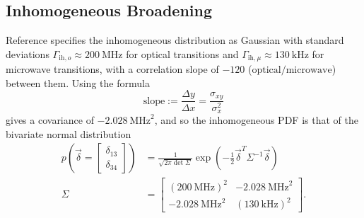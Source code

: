 \subsection{Inhomogeneous Broadening}
Reference \cite{bartholomew_chip_2020} specifies the inhomogeneous distribution as Gaussian with standard deviations $\Gamma_{\text{ih},o} \approx \qty{200}{\mega\hertz}$ for optical transitions and $\Gamma_{\text{ih},\mu} \approx \qty{130}{\kilo\hertz}$ for microwave transitions, with a correlation slope of $\num{-120}$ ($\text{optical}/\text{microwave}$) between them. Using the formula
\begin{equation}
    \text{slope} := \frac{\Delta y}{\Delta x} = \frac{\sigma_{xy}}{\sigma_x^2}
\end{equation}
gives a covariance of $\qty{-2.028}{\mega\hertz\squared}$, and so the inhomogeneous PDF is that of the bivariate normal distribution
\begin{align}
    p\left(\vec{\delta} =
    \begin{bmatrix}
        \delta_{13}\\
        \delta_{34}
    \end{bmatrix}\right)
    &=
    \frac{1}{\sqrt{2\pi\det\Sigma}} \exp\left(-\frac{1}{2}\vec{\delta}^T\Sigma^{-1}\vec{\delta}\right)\\
    \Sigma &=
    \begin{bmatrix}
        (\qty{200}{\mega\hertz})^2 & \qty{-2.028}{\mega\hertz\squared}\\
        \qty{-2.028}{\mega\hertz\squared} & (\qty{130}{\kilo\hertz})^2
    \end{bmatrix}.
\end{align}

